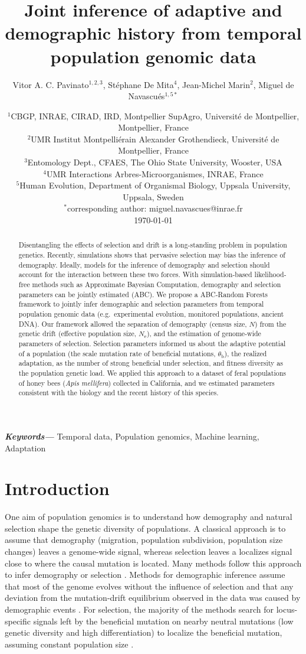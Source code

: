 \documentclass[a4paper, 12pt]{article}
\title{Joint inference of adaptive and demographic history from temporal population genomic data}
\author{\small
            Vitor A. C. Pavinato$^{1,2,3}$, Stéphane De Mita$^4$, Jean-Michel Marin$^2$, Miguel de Navascués$^{1,5*}$}
\date{{\footnotesize %
    $^1$CBGP, INRAE, CIRAD, IRD, Montpellier SupAgro, Université de Montpellier, Montpellier, France\\%
    $^2$UMR Institut Montpelliérain Alexander Grothendieck, Université de Montpellier, France \\%
    $^3$Entomology Dept., CFAES, The Ohio State University, Wooster, USA\\%
    $^4$UMR Interactions Arbres-Microorganismes, INRAE, France \\%
    $^5$Human Evolution, Department of Organismal Biology, Uppsala University, Uppsala, Sweden\\%
    $^*$corresponding author: miguel.navascues@inrae.fr\\[2ex]%
    }
    \footnotesize\today    
}
\providecommand{\keywords}[1]
{
  \small	
  \textbf{\textit{Keywords---}} #1
}
\begin{document}
\maketitle

\begin{abstract}
Disentangling the effects of selection and drift is a long-standing problem in population genetics. Recently, simulations shows that pervasive selection may bias the inference of demography. Ideally, models for the inference of demography and selection should account for the interaction between these two forces.
With simulation-based likelihood-free methods such as Approximate Bayesian Computation, demography and selection parameters can be jointly estimated (ABC). We propose a ABC-Random Forests framework to jointly infer demographic and selection parameters from temporal population genomic data (e.g.\ experimental evolution, monitored populations, ancient DNA). Our framework allowed the separation of demography (census size, $N$) from the genetic drift (effective population size, $N_{\mathrm{e}}$), and the estimation of genome-wide parameters of selection. Selection parameters informed us about the adaptive potential of a population (the scale mutation rate of beneficial mutations, $\theta_{\mathrm{b}}$), the realized adaptation, as the number of strong beneficial under selection, and fitness diversity as the population genetic load. We applied this approach to a dataset of feral populations of honey bees (\textit{Apis mellifera}) collected in California, and we estimated parameters consistent with the biology and the recent history of this species.
\end{abstract}\hspace{12pt}

\keywords{Temporal data, Population genomics, Machine learning, Adaptation}

\newpage

\section*{Introduction}

One aim of population genomics is to understand how demography and natural selection shape the genetic diversity of populations. A classical approach is to assume that demography (migration, population subdivision, population size changes) leaves a genome-wide signal, whereas selection leaves a localizes signal close to where the causal mutation is located. Many methods follow this approach to infer demography or selection \citep[reviewed by][]{Beichman:2018bx, Casillas:2017jv}. Methods for demographic inference assume that most of the genome evolves without the influence of selection and that any deviation from the mutation-drift equilibrium observed in the data was caused by demographic events \citep{Beichman:2018bx}. For selection, the majority of the methods search for locus-specific signals left by the beneficial mutation on nearby neutral mutations \citep{Tajima:1989un, Fay:2000dl, Kim:2004ih} (low genetic diversity and high differentiation) to localize the beneficial mutation, assuming constant population size \citep{Nielsen:2005kx, Pool:2010eh}.
\end{document}
